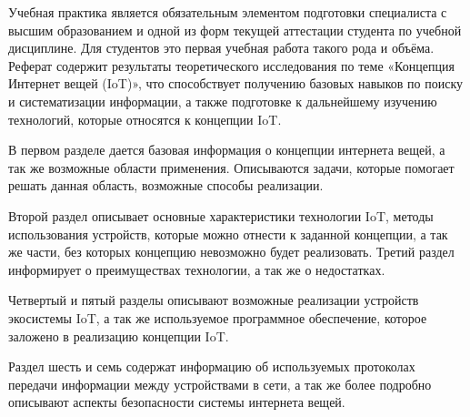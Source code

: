 Учебная практика является обязательным элементом подготовки специалиста с высшим образованием и одной из форм текущей аттестации студента по учебной дисциплине. Для студентов это первая учебная работа такого рода и объёма. Реферат содержит результаты теоретического исследования по теме «Концепция Интернет вещей (IoT)», что способствует получению базовых навыков по поиску и систематизации информации, а также подготовке к дальнейшему изучению технологий, которые относятся к концепции IoT.


В первом разделе дается базовая информация о концепции интернета вещей, а так же возможные области применения. Описываются задачи, которые помогает решать данная область, возможные способы реализации.


Второй раздел описывает основные характеристики технологии IoT, методы использования устройств, которые можно отнести к заданной концепции, а так же части, без которых концепцию невозможно будет реализовать. Третий раздел информирует о преимуществах технологии, а так же о недостатках. 


Четвертый и пятый разделы описывают возможные реализации устройств экосистемы IoT, а так же используемое программное обеспечение, которое заложено в реализацию концепции IoT.


Раздел шесть и семь содержат информацию об используемых протоколах передачи информации между устройствами в сети, а так же более подробно описывают аспекты безопасности системы интернета вещей.
